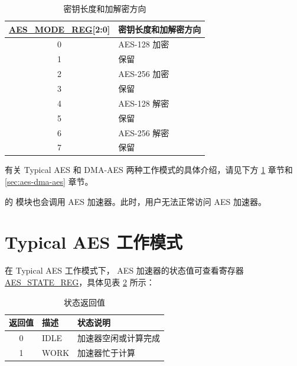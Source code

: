 \documentclass[main\_\_CN.tex]{subfiles}
\begin{document}
\begin{longtable}[c]{ | c | l | }
\caption{密钥长度和加解密方向}
\label{tab:aes-operation}
\\\hline 
\rowcolor{lightgray}
\hyperref[regdesc:AESMODEREG]{AES\_MODE\_REG}[2:0]     & 密钥长度和加解密方向\\
    \hline
    0                   & AES-128 加密    \\
    \hline
    1                   & 保留    \\
    \hline
    2                   & AES-256 加密    \\
    \hline
    3                   & 保留    \\
    \hline
    4                   & AES-128 解密    \\
    \hline
    5                   & 保留    \\
    \hline
    6                   & AES-256 解密    \\
    \hline
    7                   & 保留    \\
    \hline
\end{longtable}

有关 Typical AES 和 DMA-AES 两种工作模式的具体介绍，请见下方 \ref{sec:aes-typical-modes} 章节和 \ref{sec:aes-dma-aes} 章节。

\begin{importantlisting}
\vspace{-0.5em}

    \chipname{} 的  模块也会调用 AES 加速器。此时，用户无法正常访问 AES 加速器。
\end{importantlisting}

\section{Typical AES 工作模式}\label{sec:aes-typical-modes}

在 Typical AES 工作模式下，
AES 加速器的状态值可查看寄存器 \hyperref[regdesc:AESSTATEREG]{AES\_STATE\_REG}，具体见表 \ref{tab:aes-state-value-typical} 所示：

\begin{longtable}[c]{ |c | l | l | }
\caption{状态返回值}
\label{tab:aes-state-value-typical}
\\\hline 
\rowcolor{lightgray}
返回值 & 描述 &  状态说明 \\ \hline

    0                   & IDLE      &   加速器空闲或计算完成\\ \hline
    1                   & WORK      &   加速器忙于计算     \\ \hline
\end{longtable}
\end{document}
